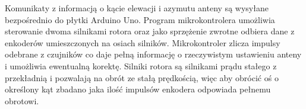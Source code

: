 Komunikaty z informacją o kącie elewacji i azymutu anteny są wysyłane bezpośrednio do płytki Arduino Uno. Program mikrokontrolera umożliwia sterowanie dwoma silnikami rotora oraz jako sprzężenie zwrotne odbiera dane z enkoderów umieszczonych na osiach silników. Mikrokontroler zlicza impulsy odebrane z czujników co daje pełną informację o rzeczywistym ustawieniu anteny i umożliwia ewentualną korektę. Silniki rotora są silnikami prądu stałego z przekładnią i pozwalają na obrót ze stałą prędkością, więc aby obrócić oś o określony kąt zbadano jaka ilość impulsów enkodera odpowiada pełnemu obrotowi. 
